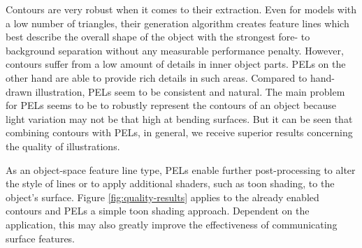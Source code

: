 \documentclass[9pt,fleqn,twoside,twocolumn]{stdglobal}
\begin{document}
    Contours are very robust when it comes to their extraction.
    Even for models with a low number of triangles, their generation algorithm creates feature lines which best describe the overall shape of the object with the strongest fore- to background separation without any measurable performance penalty.
    However, contours suffer from a low amount of details in inner object parts.
    PELs on the other hand are able to provide rich details in such areas.
    Compared to hand-drawn illustration, PELs seem to be consistent and natural.
    The main problem for PELs seems to be to robustly represent the contours of an object because light variation may not be that high at bending surfaces.
    But it can be seen that combining contours with PELs, in general, we receive superior results concerning the quality of illustrations.

    As an object-space feature line type, PELs enable further post-processing to alter the style of lines or to apply additional shaders, such as toon shading, to the object's surface.
    Figure \ref{fig:quality-results} applies to the already enabled contours and PELs a simple toon shading approach.
    Dependent on the application, this may also greatly improve the effectiveness of communicating surface features.
\end{document}
